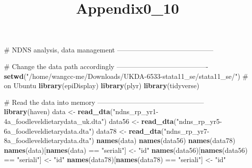 \documentclass[]{article}
\title{Appendix0\_10}
\author{}
\date{}
\newenvironment{Shaded}{\begin{snugshade}}{\end{snugshade}}
\newcommand{\KeywordTok}[1]{\textcolor[rgb]{0.12,0.11,0.11}{\textbf{#1}}}
\newcommand{\StringTok}[1]{\textcolor[rgb]{0.75,0.01,0.01}{#1}}
\newcommand{\CommentTok}[1]{\textcolor[rgb]{0.54,0.53,0.53}{#1}}
\newcommand{\OperatorTok}[1]{\textcolor[rgb]{0.12,0.11,0.11}{#1}}
\newcommand{\NormalTok}[1]{\textcolor[rgb]{0.12,0.11,0.11}{#1}}
\begin{document}
\maketitle

\begin{Shaded}
\begin{Highlighting}[]
\CommentTok{# NDNS analysis, data management ------------------------------------------}

\CommentTok{# Change the data path accordingly ----------------------------------------}
\KeywordTok{setwd}\NormalTok{(}\StringTok{"/home/wangcc-me/Downloads/UKDA-6533-stata11_se/stata11_se/"}\NormalTok{) }\CommentTok{# on Ubuntu}
\KeywordTok{library}\NormalTok{(epiDisplay)}
\KeywordTok{library}\NormalTok{(plyr)}
\KeywordTok{library}\NormalTok{(tidyverse)}

\CommentTok{# Read the data into memory -----------------------------------------------}
\KeywordTok{library}\NormalTok{(haven)}
\NormalTok{data <-}\StringTok{ }\KeywordTok{read_dta}\NormalTok{(}\StringTok{"ndns_rp_yr1-4a_foodleveldietarydata_uk.dta"}\NormalTok{)}
\NormalTok{data56 <-}\StringTok{ }\KeywordTok{read_dta}\NormalTok{(}\StringTok{"ndns_rp_yr5-6a_foodleveldietarydata.dta"}\NormalTok{)}
\NormalTok{data78 <-}\StringTok{ }\KeywordTok{read_dta}\NormalTok{(}\StringTok{"ndns_rp_yr7-8a_foodleveldietarydata.dta"}\NormalTok{)}
\KeywordTok{names}\NormalTok{(data)}
\KeywordTok{names}\NormalTok{(data56)}
\KeywordTok{names}\NormalTok{(data78)}
\KeywordTok{names}\NormalTok{(data)[}\KeywordTok{names}\NormalTok{(data) }\OperatorTok{==}\StringTok{ "seriali"}\NormalTok{] <-}\StringTok{ "id"}
\KeywordTok{names}\NormalTok{(data56)[}\KeywordTok{names}\NormalTok{(data56) }\OperatorTok{==}\StringTok{ "seriali"}\NormalTok{] <-}\StringTok{ "id"}
\KeywordTok{names}\NormalTok{(data78)[}\KeywordTok{names}\NormalTok{(data78) }\OperatorTok{==}\StringTok{ "seriali"}\NormalTok{] <-}\StringTok{ "id"}


\end{Highlighting}
\end{Shaded}
\end{document}
